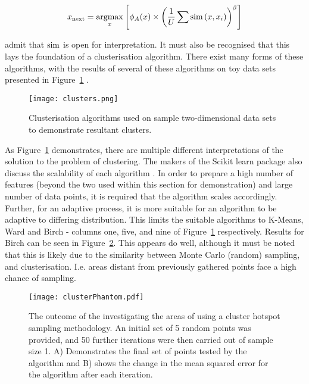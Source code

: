 \begin{equation}
  \label{eq:Settles_density}
  x_\mathrm{next}=\operatorname*{argmax}_x{\left[\phi_A(x)\times{\left(\frac{1}{U}\sum{\operatorname*{sim}{(x, x_i)}}\right)}^\beta\right]}
\end{equation}

\textcite{Set08} admit that $\operatorname*{sim}$ is open for interpretation. It must also be recognised that this lays the foundation of a clusterisation algorithm. There exist many forms of these algorithms, with the results of several of these algorithms on toy data sets presented in Figure~\ref{fig:ClusterResults} \cite{SciClus}.

\begin{figure}[H]
  \begin{center}
    \texttt{[image: clusters.png]}
    \caption[]{Clusterisation algorithms used on sample two-dimensional data sets to demonstrate resultant clusters.}
    \label{fig:ClusterResults}
  \end{center}
\end{figure}

As Figure~\ref{fig:ClusterResults} demonstrates, there are multiple different interpretations of the solution to the problem of clustering. The makers of the Scikit learn package also discuss the scalability of each algorithm \cite{SciClus}. In order to prepare a high number of features (beyond the two used within this section for demonstration) and large number of data points, it is required that the algorithm scales accordingly. Further, for an adaptive process, it is more suitable for an algorithm to be adaptive to differing distribution. This limits the suitable algorithms to K-Means, Ward and Birch - columns one, five, and nine of Figure~\ref{fig:ClusterResults} respectively. Results for Birch can be seen in Figure~\ref{fig:clusterPhantom}. This appears do well, although it must be noted that this is likely due to the similarity between Monte Carlo (random) sampling, and clusterisation. I.e. areas distant from previously gathered points face a high chance of sampling.

\begin{figure}[H]
  \begin{center}
    \texttt{[image: clusterPhantom.pdf]}
    \caption[Cluster Hotspot Sampling Illustration]{The outcome of the investigating the areas of using a cluster hotspot sampling methodology. An initial set of 5 random points was provided, and 50 further iterations were then carried out of sample size 1. A) Demonstrates the final set of points tested by the algorithm and B) shows the change in the mean squared error for the algorithm after each iteration.}
    \label{fig:clusterPhantom}
  \end{center}
\end{figure}


